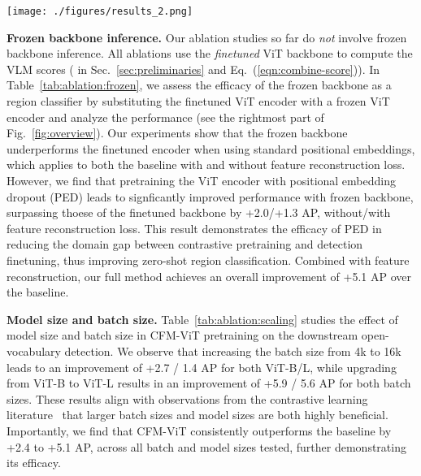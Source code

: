 \documentclass[10pt,twocolumn,letterpaper]{article}
\newcommand{\figref}[1]{Fig.~\ref{#1}}
\newcommand{\tabref}[1]{Table~\ref{#1}}
\newcommand{\eqnref}[1]{Eq.~(\ref{#1})}
\newcommand{\secref}[1]{Sec.~\ref{#1}}
\renewcommand{\paragraph}[1]{\vspace{1mm}\noindent\textbf{#1}}
\newcommand{\ours}{CFM-ViT\xspace}
\begin{document}
\begin{figure*}[t]
\centering
\texttt{[image: ./figures/results\_2.png]}
\caption{\textbf{Qualitative results on LVIS novel categories (top) and Objects365 zero-shot transfer detection (bottom).} For LVIS results, we only show the novel categories for clarity. \ours detects many novel categories such as \textit{rag doll, persimmon, paperweight, hardback book, shepherd dog} on LVIS, and \textit{shrimp, power outlet} on Objects365.}
\label{fig:results}
\vspace{-3mm}
\end{figure*}


\paragraph{Frozen backbone inference.}\quad
Our ablation studies so far do \textit{not} involve frozen backbone inference. All ablations use the \textit{finetuned} ViT backbone to compute the VLM scores ( in \secref{sec:preliminaries} and \eqnref{eqn:combine-score}). In \tabref{tab:ablation:frozen}, we assess the efficacy of the frozen backbone as a region classifier by substituting the finetuned ViT encoder with a frozen ViT encoder and analyze the performance (see the rightmost part of \figref{fig:overview}). Our experiments show that the frozen backbone underperforms the finetuned encoder when using standard positional embeddings, which applies to both the baseline with and without feature reconstruction loss. However, we find that pretraining the ViT encoder with positional embedding dropout (PED) leads to signficantly improved performance with frozen backbone, surpassing thoese of the finetuned backbone by +2.0/+1.3 AP, without/with feature reconstruction loss. This result demonstrates the efficacy of PED in reducing the domain gap between contrastive pretraining and detection finetuning, thus improving zero-shot region classification. Combined with feature reconstruction, our full method achieves an overall improvement of +5.1 AP over the baseline.


\paragraph{Model size and batch size.}\quad
\tabref{tab:ablation:scaling} studies the effect of model size and batch size in \ours pretraining on the downstream open-vocabulary detection. We observe that increasing the batch size from 4k to 16k leads to an improvement of +2.7 / 1.4 AP for both ViT-B/L, while upgrading from ViT-B to ViT-L results in an improvement of +5.9 / 5.6 AP for both batch sizes. These results align with observations from the contrastive learning literature~\cite{radford2021clip,align,basic} that larger batch sizes and model sizes are both highly beneficial. Importantly, we find that \ours consistently outperforms the baseline by +2.4 to +5.1 AP, across all batch and model sizes tested, further demonstrating its efficacy.
\end{document}
